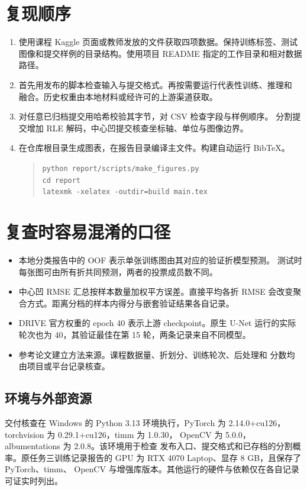 \section{复现顺序}
\begin{enumerate}
\item 使用课程 Kaggle 页面或教师发放的文件获取四项数据。保持训练标签、测试
图像和提交样例的目录结构。使用项目 README 指定的工作目录和相对数据路径。
\item 首先用发布的脚本检查输入与提交格式。再按需要运行代表性训练、推理和
融合。历史权重由本地材料或经许可的上游渠道获取。
\item 对任意已归档提交用哈希校验其字节，对 CSV 检查字段与样例顺序。
分割提交增加 RLE 解码，中心凹提交核查坐标轴、单位与图像边界。
\item 在仓库根目录生成图表，在报告目录编译主文件。构建自动运行 BibTeX。
\begin{quote}\small
\texttt{python report/scripts/make\_figures.py}\\
\texttt{cd report}\\
\texttt{latexmk -xelatex -outdir=build main.tex}
\end{quote}
\end{enumerate}

\section{复查时容易混淆的口径}
\begin{itemize}
\item 本地分类报告中的 OOF 表示单张训练图由其对应的验证折模型预测。
测试时每张图可由所有折共同预测，两者的投票成员数不同。
\item 中心凹 RMSE 汇总按样本数量加权平方误差。直接平均各折 RMSE
会改变聚合方式。距离分档的样本内得分与嵌套验证结果各自记录。
\item DRIVE 官方权重的 epoch 40 表示上游 checkpoint。原生 U-Net
运行的实际轮次也为 40，其验证最佳在第 15 轮，两条记录来自不同模型。
\item 参考论文建立方法来源。课程数据量、折划分、训练轮次、后处理和
分数均由项目或平台记录核查。
\end{itemize}

\subsection{环境与外部资源}
交付核查在 Windows 的 Python 3.13 环境执行，PyTorch 为
2.14.0+cu126，torchvision 为 0.29.1+cu126，timm 为 1.0.30，
OpenCV 为 5.0.0，albumentations 为 2.0.8。该环境用于检查
发布入口、提交格式和已存档的分割概率。原任务三训练记录报告的 GPU
为 RTX 4070 Laptop、显存 8 GB，且保存了 PyTorch、timm、
OpenCV 与增强库版本。其他运行的硬件与依赖仅在各自记录可证实时列出。

